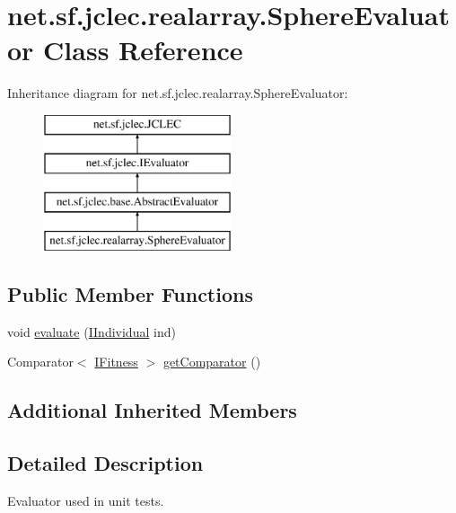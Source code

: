 \hypertarget{classnet_1_1sf_1_1jclec_1_1realarray_1_1_sphere_evaluator}{\section{net.\-sf.\-jclec.\-realarray.\-Sphere\-Evaluator Class Reference}
\label{classnet_1_1sf_1_1jclec_1_1realarray_1_1_sphere_evaluator}
}
Inheritance diagram for net.\-sf.\-jclec.\-realarray.\-Sphere\-Evaluator\-:\begin{figure}[H]
\begin{center}
\leavevmode
\includegraphics[height=4.000000cm]{classnet_1_1sf_1_1jclec_1_1realarray_1_1_sphere_evaluator}
\end{center}
\end{figure}
\subsection*{Public Member Functions}
\begin{DoxyCompactItemize}
\item 
void \hyperlink{classnet_1_1sf_1_1jclec_1_1realarray_1_1_sphere_evaluator_a89540f711cf70d68b5c30f798e90d5fa}{evaluate} (\hyperlink{interfacenet_1_1sf_1_1jclec_1_1_i_individual}{I\-Individual} ind)
\item 
Comparator$<$ \hyperlink{interfacenet_1_1sf_1_1jclec_1_1_i_fitness}{I\-Fitness} $>$ \hyperlink{classnet_1_1sf_1_1jclec_1_1realarray_1_1_sphere_evaluator_ac0f1edb38d66e874fea2ebd9924504c2}{get\-Comparator} ()
\end{DoxyCompactItemize}
\subsection*{Additional Inherited Members}


\subsection{Detailed Description}
Evaluator used in unit tests.


